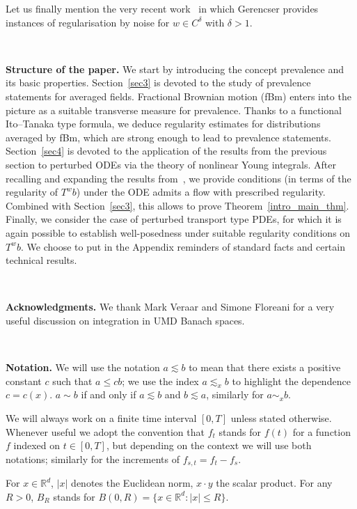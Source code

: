 \documentclass[10pt]{article}
\newcommand{\tmstrong}[1]{\textbf{#1}}
\newcommand{\tmtextbf}[1]{{\bfseries{#1}}}
\begin{document}
Let us finally mention the very recent work~{\cite{gerencser2020}} in which
Gerencser provides instances of regularisation by noise for $w \in C^{\delta}$
with $\delta > 1$.

\

\tmtextbf{Structure of the paper.} We start by introducing the concept
prevalence and its basic properties. Section~\ref{sec3} is devoted to the
study of prevalence statements for averaged fields. Fractional Brownian motion
(fBm) enters into the picture as a suitable transverse measure for prevalence.
Thanks to a functional Ito--Tanaka type formula, we deduce regularity
estimates for distributions averaged by fBm, which are strong enough to lead
to prevalence statements. Section~\ref{sec4} is devoted to the application of
the results from the previous section to perturbed ODEs via the theory of
nonlinear Young integrals. After recalling and expanding the results
from~{\cite{catelliergubinelli}}, we provide conditions (in terms of the
regularity of $T^w b$) under the ODE admits a flow with prescribed regularity.
Combined with Section~\ref{sec3}, this allows to prove
Theorem~\ref{intro_main_thm}. Finally, we consider the case of perturbed
transport type PDEs, for which it is again possible to establish
well-posedness under suitable regularity conditions on $T^w b$. We choose to
put in the Appendix reminders of standard facts and certain technical results.

\

\tmtextbf{Acknowledgments.} We thank Mark Veraar and Simone Floreani for a
very useful discussion on integration in UMD Banach spaces.

\

{\tmstrong{Notation.}} We will use the notation $a \lesssim b$ to mean that
there exists a positive constant $c$ such that $a \leqslant c b$; we use the
index $a \lesssim_x b$ to highlight the dependence $c = c (x)$. $a \sim b$ if
and only if $a \lesssim b$ and $b \lesssim a$, similarly for $a \sim_x b$.

We will always work on a finite time interval $[0, T]$ unless stated
otherwise. Whenever useful we adopt the convention that $f_t$ stands for $f
(t)$ for a function $f$ indexed on $t \in [0, T]$, but depending on the
context we will use both notations; similarly for the increments of $f_{s, t}
= f_t - f_s$.

For $x \in \mathbb{R}^d$, $| x |$ denotes the Euclidean norm, $x \cdot y$ the
scalar product. For any $R > 0$, $B_R$ stands for $B (0, R) = \{ x \in
\mathbb{R}^d : | x | \leqslant R \}$.
\end{document}
